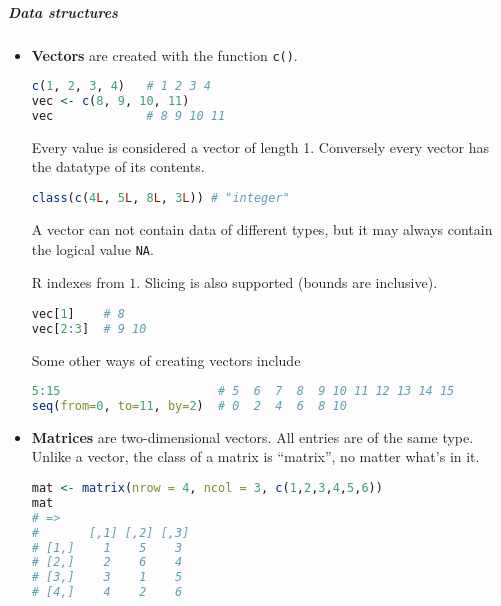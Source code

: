 \subparagraph{Data structures}
\begin{itemize}
\item \textbf{Vectors} are created with the function \texttt{c()}.
\begin{lstlisting}[language={r}, style=snippet]
c(1, 2, 3, 4)   # 1 2 3 4
vec <- c(8, 9, 10, 11)
vec             # 8 9 10 11
\end{lstlisting}
Every value is considered a vector of length 1. Conversely every vector has the datatype of its contents.
\begin{lstlisting}[language={r}, style=snippet]
class(c(4L, 5L, 8L, 3L)) # "integer"
\end{lstlisting}
A vector can not contain data of different types, but it may always contain the logical value \texttt{NA}.

R indexes from $1$. Slicing is also supported (bounds are inclusive).
\begin{lstlisting}[language={r}, style=snippet]
vec[1]    # 8
vec[2:3]  # 9 10
\end{lstlisting}

Some other ways of creating vectors include
\begin{lstlisting}[language={r}, style=snippet]
5:15                      # 5  6  7  8  9 10 11 12 13 14 15
seq(from=0, to=11, by=2)  # 0  2  4  6  8 10
\end{lstlisting}
\item \textbf{Matrices} are two-dimensional vectors. All entries are of the same type. Unlike a vector, the class of a matrix is ``matrix'', no matter what's in it.
\begin{lstlisting}[language={r}, style=snippet]
mat <- matrix(nrow = 4, ncol = 3, c(1,2,3,4,5,6))
mat
# =>
#       [,1] [,2] [,3]
# [1,]    1    5    3
# [2,]    2    6    4
# [3,]    3    1    5
# [4,]    4    2    6


\end{lstlisting}
\end{itemize}
